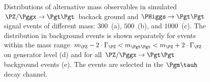 {{{{\begin{figure}
\begin{center}
\end{center}
\caption{
  Distributions of alternative mass observables in simulated $\PZ/\Pggx \to \Pgt\Pgt$ backack ground
  and $\PHiggs \to \Pgt\Pgt$ signal events of different mass:
  $300$~\GeV (a), $500$~\GeV (b), and $1000$~\GeV (c).
  The distribution in background events is shown separately for events within the
  mass range $m_{\PZ} - 2 \cdot \Gamma_{\PZ} < m_{\Pgt\Pgt} < m_{\PZ} + 2 \cdot \Gamma_{\PZ}$ on generator level (d)
  and for all $\PZ/\Pggx \to \Pgt\Pgt$ background events (e).
  The events are selected in the $\Pgm\tauh$ decay channel.
}
\label{fig:massDistributions_mssm_mutau}
\end{figure}

}}}}
